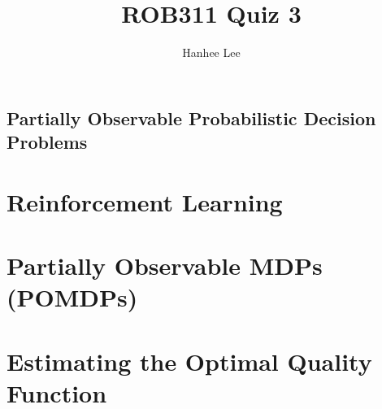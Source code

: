 \documentclass{article}
\title{ROB311 Quiz 3}
\author{Hanhee Lee}
\begin{document}
\maketitle

\tableofcontents
\newpage

\begin{center}
    \section*{Partially Observable Probabilistic Decision Problems}
\end{center}

\section{Reinforcement Learning}

\newpage

\section{Partially Observable MDPs (POMDPs)}

\newpage

\section{Estimating the Optimal Quality Function}

\end{document}
